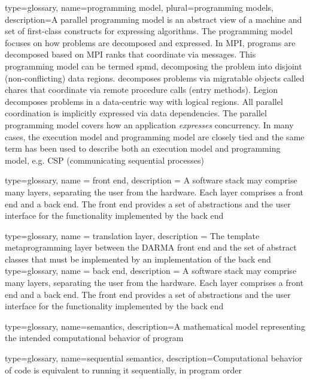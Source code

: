 {
  type=glossary,
  name={programming model},
  plural={programming models},
  description={A parallel programming model is an abstract view of a machine
    and set of first-class constructs for expressing algorithms. The programming
      model focuses on how problems are decomposed and expressed.  In
      \gls{MPI}, programs are decomposed based on \gls{MPI} ranks that coordinate via
      messages. This programming model can be termed \gls{spmd}, decomposing
      the problem into disjoint (non-conflicting) data regions.  \Charm{}
    decomposes problems via migratable objects called \glspl{chare} that
      coordinate via remote procedure calls (entry methods). Legion decomposes
      problems in a data-centric way with logical regions.  All parallel
      coordination is implicitly expressed via data dependencies.  The parallel
      programming model covers how an application \emph{expresses}
    \gls{concurrency}.
In many cases, the \gls{execution model} and programming model are closely tied
and the same term has been used to describe both an execution model and programming model, e.g.
CSP (communicating sequential processes)}
}

{
  type=glossary,
  name = {front end},
  description = {A software stack may comprise many layers, separating the 
    user from the hardware.  Each layer comprises a front end
      and a \gls{back end}.  The front end provides a set of abstractions and the
      user interface for the functionality implemented by the back end}
}

{
  type=glossary,
  name = {translation layer},
  description = {The \CC \gls{template metaprogramming} layer between the
    DARMA \gls{front end} and the set of abstract classes that must be implemented
    by an implementation of the \gls{back end}}
}
{
  type=glossary,
  name = {back end},
  description = {A software stack may comprise many layers, separating the 
    user from the hardware.  Each layer comprises a \gls{front end}
      and a back end.  The front end provides a set of abstractions and the
      user interface for the functionality implemented by the back end}
}

{
  type=glossary,
    name={semantics},
    description={A mathematical model representing the intended computational behavior of program}
}

{
  type=glossary,
  name={sequential semantics},
  description={Computational behavior of code is equivalent to running it
    sequentially, in program order}
}

